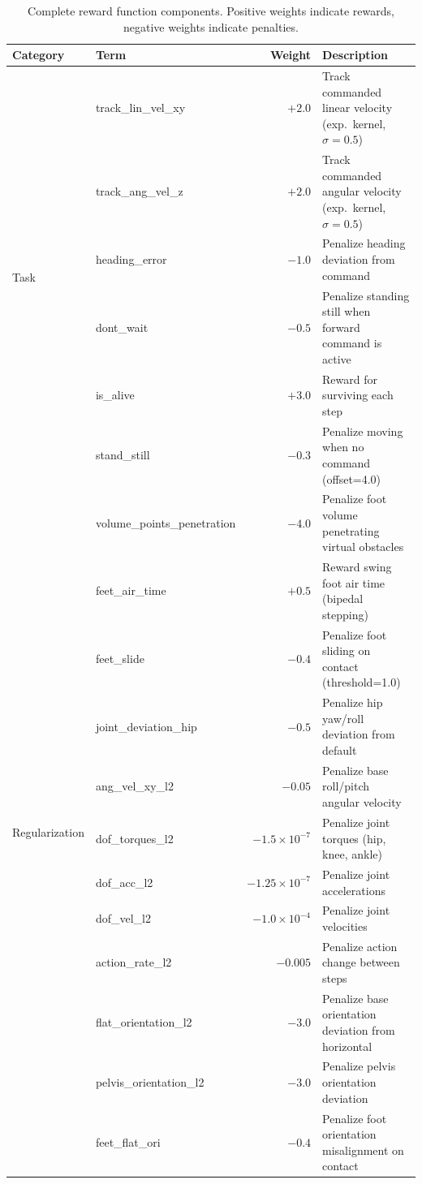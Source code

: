 \begin{table}[t]
\centering
\caption{Complete reward function components. Positive weights indicate rewards, negative weights indicate penalties.}
\label{tab:reward_terms}
\footnotesize
\begin{tabular}{@{}lp{3.2cm}rp{7cm}@{}}
\toprule
\textbf{Category} & \textbf{Term} & \textbf{Weight} & \textbf{Description} \\
\midrule
\multirow{6}{*}{Task} & track\_lin\_vel\_xy & $+2.0$ & Track commanded linear velocity (exp.\ kernel, $\sigma=0.5$) \\
 & track\_ang\_vel\_z & $+2.0$ & Track commanded angular velocity (exp.\ kernel, $\sigma=0.5$) \\
 & heading\_error & $-1.0$ & Penalize heading deviation from command \\
 & dont\_wait & $-0.5$ & Penalize standing still when forward command is active \\
 & is\_alive & $+3.0$ & Reward for surviving each step \\
 & stand\_still & $-0.3$ & Penalize moving when no command (offset=4.0) \\
\midrule
\multirow{12}{*}{Regularization} & volume\_points\_penetration & $-4.0$ & Penalize foot volume penetrating virtual obstacles \\
 & feet\_air\_time & $+0.5$ & Reward swing foot air time (bipedal stepping) \\
 & feet\_slide & $-0.4$ & Penalize foot sliding on contact (threshold=1.0) \\
 & joint\_deviation\_hip & $-0.5$ & Penalize hip yaw/roll deviation from default \\
 & ang\_vel\_xy\_l2 & $-0.05$ & Penalize base roll/pitch angular velocity \\
 & dof\_torques\_l2 & $-1.5 \times 10^{-7}$ & Penalize joint torques (hip, knee, ankle) \\
 & dof\_acc\_l2 & $-1.25 \times 10^{-7}$ & Penalize joint accelerations \\
 & dof\_vel\_l2 & $-1.0 \times 10^{-4}$ & Penalize joint velocities \\
 & action\_rate\_l2 & $-0.005$ & Penalize action change between steps \\
 & flat\_orientation\_l2 & $-3.0$ & Penalize base orientation deviation from horizontal \\
 & pelvis\_orientation\_l2 & $-3.0$ & Penalize pelvis orientation deviation \\
 & feet\_flat\_ori & $-0.4$ & Penalize foot orientation misalignment on contact \\

\end{tabular}
\end{table}
